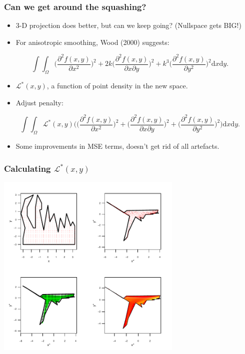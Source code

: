 \documentclass[ignorenonframetext]{beamer} %
\newcommand{\bi}{\begin{itemize}}
\newcommand{\ei}{\end{itemize}}
\begin{document}
\begin{frame}
	\frametitle{Can we get around the squashing?}
		\bi
             \item 3-D projection does better, but can we keep going? (Nullspace gets BIG!)
			\item For anisotropic smoothing, Wood (2000) suggests: 
		\ei
		\begin{equation*}
            \int\int_\Omega \Big(\frac{\partial^2 f(x,y)}{\partial x^2}\Big)^2 + 2k\Big(\frac{\partial^2 f(x,y)}{\partial x \partial y}\Big)^2 + k^3 \Big(\frac{\partial^2 f(x,y)}{\partial y^2}\Big)^2 \text{d}x\text{d}y.
            \end{equation*}
		\bi
			\item $\mathcal{L}^*(x,y)$, a function of point density in the new space.
              \item Adjust penalty:
          \ei
            \begin{equation*}
	            \int\int_\Omega \mathcal{L}^*(x,y) \Big( \Big(\frac{\partial^2 f(x,y)}{\partial x^2}\Big)^2 + \Big(\frac{\partial^2 f(x,y)}{\partial x \partial y}\Big)^2 + \Big(\frac{\partial^2 f(x,y)}{\partial y^2}\Big)^2\Big) \text{d}x\text{d}y.
            \end{equation*}
           \bi
           	\item Some improvements in MSE terms, doesn't get rid of all artefacts.
		\ei
\end{frame}

\begin{frame}
	\frametitle{Calculating $\mathcal{L}^*(x,y)$}
	\centering
              \includegraphics[height=3.5in]{figs/densgrid.pdf}
\end{frame}
\end{document}
